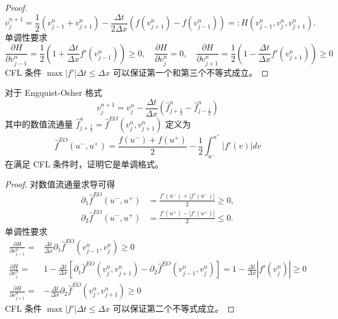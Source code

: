 \begin{proof}
    \[
        v_j^{n+1} = \frac12 (v_{j-1}^n + v_{j+1}^n)
        - \frac{\Delta t}{2\Delta x} \left(f(v_{j+1}^n)-f(v_{j-1}^n)\right)  =:   H(v_{j-1}^n,v_j^n,v_{j+1}^n).
    \]
    单调性要求
    \[
        \frac{\partial H}{\partial v^n_{j-1}} ={}  \frac12(1 + \frac{\Delta t}{\Delta x}f'(v^n_{j-1}))
        \ge 0 ,\quad
        \frac{\partial H}{\partial v^n_{j}} ={}  0       ,\quad
        \frac{\partial H}{\partial v^n_{j+1}} ={} \frac12(1 - \frac{\Delta t}{\Delta x}f'(v^n_{j+1}))
        \ge 0
    \]
    CFL 条件 $\max |f'| \Delta t \le \Delta x$ 可以保证第一个和第三个不等式成立。
\end{proof}


\begin{example}
    对于 Engquist-Osher 格式
    \[
        v_j^{n+1} = v_j^n - \frac{\Delta t}{\Delta x}\left( \hat{f}_{j+\frac12}^n - \hat{f}_{j-\frac12}^n \right)
    \]
    其中的数值流通量 $\hat{f}_{j+\frac12}^n = \hat{f}^{EO}(v_j^n,v_{j+1}^n)$ 定义为
    \[
        \hat{f}^{EO}(u^-,u^+) = \frac{f(u^-) + f(u^+)}2 - \frac12 \int_{u^-}^{u^+} |f'(v)| dv
    \]
    在满足 CFL 条件时，证明它是单调格式。
\end{example}

\begin{proof}
    对数值流通量求导可得
    \begin{align*}
        \partial_1 \hat{f}^{EO}(u^-,u^+) & = \frac{f'(u^-) + |f'(u^-)|}2 \ge 0, \\
        \partial_2 \hat{f}^{EO}(u^-,u^+) & = \frac{f'(u^+) - |f'(u^+)|}2 \le 0.
    \end{align*}
    单调性要求
    \begin{align*}
        \frac{\partial H}{\partial v^n_{j-1}} ={} & \frac{\Delta t}{\Delta x} \partial_1 \hat{f}^{EO}(v_{j-1}^n,v^n_{j}) \ge 0   \\
        \frac{\partial H}{\partial v^n_{j}} ={}   & 1 - \frac{\Delta t}{\Delta x}
        \left[
            \partial_1 \hat{f}^{EO}(v_{j}^n,v^n_{j+1}) - \partial_2 \hat{f}^{EO}(v_{j-1}^n,v^n_{j})
        \right]  = 1 - \frac{\Delta t}{\Delta x} |f'(v_j^n)| \ge 0                                                               \\
        \frac{\partial H}{\partial v^n_{j+1}} ={} & - \frac{\Delta t}{\Delta x} \partial_2 \hat{f}^{EO}(v_{j}^n,v^n_{j+1}) \ge 0
    \end{align*}
    CFL 条件 $\max |f'| \Delta t \le \Delta x$ 可以保证第二个不等式成立。
\end{proof}


